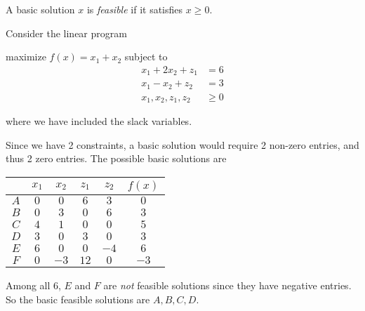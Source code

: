 \documentclass[a4paper]{article}
\begin{document}
\begin{defi}
  A basic solution $x$ is \emph{feasible} if it satisfies $x \geq 0$.
\end{defi}

\begin{eg}
  Consider the linear program
  \begin{center}
    maximize $f(x) = x_1 + x_2$ subject to
    \begin{align*}
      x_1 + 2x_2 + z_1&= 6\\
      x_1 - x_2 + z_2 &= 3\\
      x_1, x_2, z_1, z_2 &\geq 0
    \end{align*}
  \end{center}
  where we have included the slack variables.

  Since we have 2 constraints, a basic solution would require 2 non-zero entries, and thus 2 zero entries. The possible basic solutions are
  \begin{center}
    \begin{tabular}{cccccc}
      \toprule
      & $x_1$ & $x_2$ & $z_1$ & $z_2$ & $f(x)$\\
      \midrule
      $A$ & $0$ & $0$ & $6$ & $3$ & $0$\\
      $B$ & $0$ & $3$ & $0$ & $6$ & $3$\\
      $C$ & $4$ & $1$ & $0$ & $0$ & $5$\\
      $D$ & $3$ & $0$ & $3$ & $0$ & $3$\\
      $E$ & $6$ & $0$ & $0$ & $-4$ & $6$\\
      $F$ & $0$ & $-3$ & $12$ & $0$ & $-3$\\
      \bottomrule
    \end{tabular}
  \end{center}
  Among all 6, $E$ and $F$ are \emph{not} feasible solutions since they have negative entries. So the basic feasible solutions are $A, B, C, D$.
  \begin{center}
  \end{center}
\end{eg}
\end{document}
